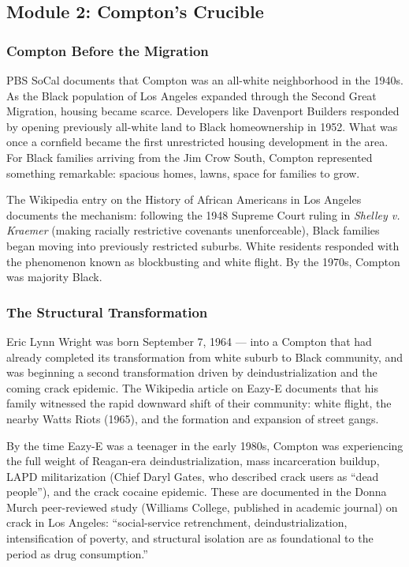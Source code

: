 \documentclass[11pt,letterpaper]{article}
\begin{document}
\subsection{Module 2: Compton's Crucible}

\subsubsection{Compton Before the Migration}

PBS SoCal documents that Compton was an all-white neighborhood in the 1940s. As the Black population of Los Angeles expanded through the Second Great Migration, housing became scarce. Developers like Davenport Builders responded by opening previously all-white land to Black homeownership in 1952. What was once a cornfield became the first unrestricted housing development in the area. For Black families arriving from the Jim Crow South, Compton represented something remarkable: spacious homes, lawns, space for families to grow.

The Wikipedia entry on the History of African Americans in Los Angeles documents the mechanism: following the 1948 Supreme Court ruling in \textit{Shelley v. Kraemer} (making racially restrictive covenants unenforceable), Black families began moving into previously restricted suburbs. White residents responded with the phenomenon known as blockbusting and white flight. By the 1970s, Compton was majority Black.

\subsubsection{The Structural Transformation}

Eric Lynn Wright was born September 7, 1964 --- into a Compton that had already completed its transformation from white suburb to Black community, and was beginning a second transformation driven by deindustrialization and the coming crack epidemic. The Wikipedia article on Eazy-E documents that his family witnessed the rapid downward shift of their community: white flight, the nearby Watts Riots (1965), and the formation and expansion of street gangs.

By the time Eazy-E was a teenager in the early 1980s, Compton was experiencing the full weight of Reagan-era deindustrialization, mass incarceration buildup, LAPD militarization (Chief Daryl Gates, who described crack users as ``dead people''), and the crack cocaine epidemic. These are documented in the Donna Murch peer-reviewed study (Williams College, published in academic journal) on crack in Los Angeles: ``social-service retrenchment, deindustrialization, intensification of poverty, and structural isolation are as foundational to the period as drug consumption.''
\end{document}
